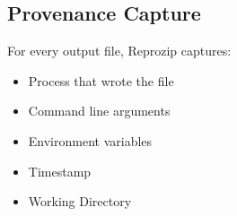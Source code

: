 \subsection{Provenance Capture}
\begin{flushleft}
For every output file, Reprozip captures: 
\end{flushleft}
\begin{itemize}
  \item Process that wrote the file
  \item Command line arguments
  \item Environment variables
  \item Timestamp
  \item Working Directory
\end{itemize}



